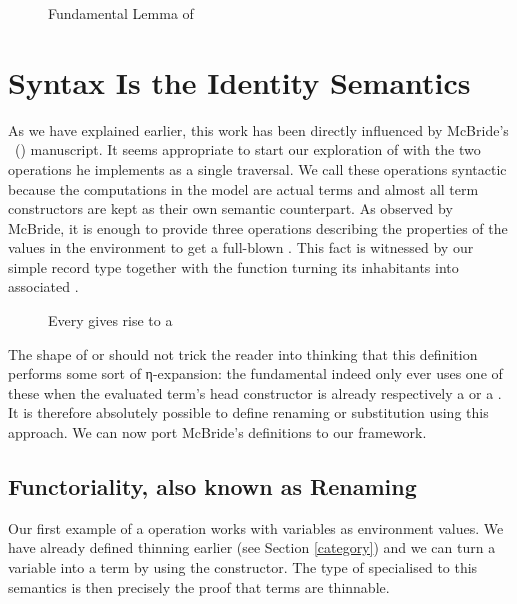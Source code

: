 \begin{figure}[h]
\caption{Fundamental Lemma of \label{fig:fundsem}}
\end{figure}

\section{Syntax Is the Identity Semantics}
\label{syntactic}

As we have explained earlier, this work has been directly influenced by
McBride's ~(\citeyear{mcbride2005type}) manuscript. It seems appropriate
to start our exploration of  with the two operations he
implements as a single traversal. We call these operations syntactic
because the computations in the model are actual terms and almost all term
constructors are kept as their own semantic counterpart. As observed by
McBride, it is enough to provide three operations describing the properties
of the values in the environment to get a full-blown . This
fact is witnessed by our simple  record type together with
the  function turning its inhabitants into associated
.

\begin{figure}[h]
\caption{Every  gives rise to a \label{fig:syntactic}}
\end{figure}

The shape of  or  should not trick the reader
into thinking that this definition performs some sort of η-expansion:
the fundamental  indeed only ever uses one of these when the
evaluated term's head constructor is already respectively a 
or a . It is therefore absolutely possible to define renaming
or substitution using this approach. We can now port McBride's definitions
to our framework.


\subsection{Functoriality, also known as Renaming}

Our first example of a  operation works with variables as
environment values. We have already defined thinning earlier (see
Section \ref{category}) and we can turn a variable into a term by using
the  constructor. The type of  specialised to this
semantics is then precisely the proof that terms are thinnable.

